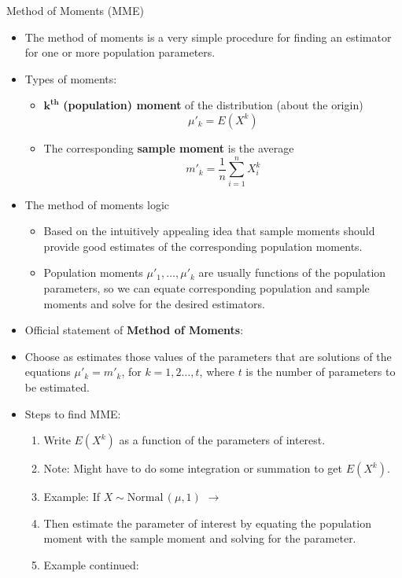 \documentclass{article}
\newcommand{\vecn}[2]{#1_1, \ldots, #1_{#2}}	%
\newcommand{\follow}[1]{\sim \text{#1}\,}		%
\begin{document}
Method of Moments (MME)\bigskip
\begin{itemize}
    \item The method of moments is a very simple procedure for finding an estimator for one or more population parameters.
    \item Types of moments:
    \begin{itemize}
        \item $\boldsymbol{k^\text{th}}$ \textbf{(population) moment} of the distribution (about the origin)
        \[\mu'_k = E(X^k)\]
        \item The corresponding \textbf{sample moment} is the average
        \[m'_k = \frac{1}{n} \sum_{i = 1}^n {X^k_i}\]
    \end{itemize}
    \item The method of moments logic
    \begin{itemize}
        \item Based on the intuitively appealing idea that sample moments should provide good estimates of the corresponding population moments.
        \item Population moments $\vecn{\mu'}{k}$ are usually functions of the population parameters, so we can equate corresponding population and sample moments and solve for the desired estimators.
    \end{itemize}\newpage
    \item Official statement of \textbf{Method of Moments}:
    \item[] Choose as estimates those values of the parameters that are solutions of the equations $\mu'_k = m'_k$, for $k = 1, 2 \ldots, t$, where $t$ is the number of parameters to be estimated.\bigskip
    \item Steps to find MME:
    \begin{enumerate}
        \item Write $E(X^k)$ as a function of the parameters of interest.
        \item[] Note: Might have to do some integration or summation to get $E(X^k)$.
        \item[] Example: If $X \follow{Normal}(\mu, 1)$ $\rightarrow$\bigskip
        \item Then estimate the parameter of interest by equating the population moment with the sample moment and solving for the parameter.
        \item[] Example continued: \bigskip
    \end{enumerate}
\end{itemize}\bigskip
\end{document}
